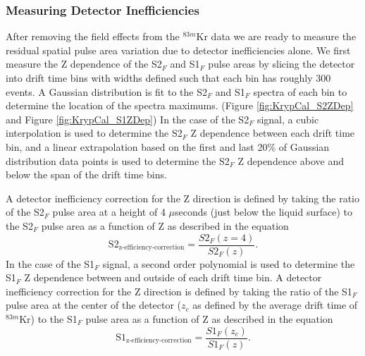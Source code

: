 \subsubsection{Measuring Detector Inefficiencies}


After removing the field effects from the $^{83m}$Kr data we are ready to measure the residual spatial pulse area variation due to detector inefficiencies alone.  We first measure the Z dependence of the S2$_F$ and S1$_F$ pulse areas by slicing the detector into drift time bins with widths defined such that each bin has roughly 300 events.  A Gaussian distribution is fit to the S2$_F$ and S1$_F$ spectra of each bin to determine the location of the spectra maximums. (Figure \ref{fig:KrypCal_S2ZDep} and Figure \ref{fig:KrypCal_S1ZDep}) In the case of the S2$_F$ signal, a cubic interpolation is used to determine the S2$_F$ Z dependence between each drift time bin, and a linear extrapolation based on the first and last 20\% of Gaussian distribution data points is used to determine the S2$_F$ Z dependence above and below the span of the drift time bins.  

A detector inefficiency correction for the Z direction is defined by taking the ratio of the S2$_F$  pulse area at a height of 4 $\mu$seconds (just below the liquid surface) to the S2$_F$ pulse area as a function of Z as described in the equation
\begin{equation}
\mbox{S}2_{\mbox{z-efficiency-correction}} = \frac{S2_F(z=4)}{S2_F(z)}.
\end{equation} 
In the case of the S1$_F$ signal, a second order polynomial is used to determine the S1$_F$ Z dependence between and outside of each drift time bin. A detector inefficiency correction for the Z direction is defined by taking the ratio of the S1$_F$  pulse area at the center of the detector ($z_c$ as defined by the average drift time of $^{83m}$Kr) to the S1$_F$ pulse area as a function of Z as described in the equation
\begin{equation}
\mbox{S}1_{\mbox{z-efficiency-correction}} = \frac{S1_F(z_c)}{S1_F(z)}.
\end{equation} 

